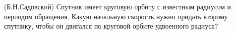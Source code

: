 (Б.Н.Садовский)
Спутник имеет круговую орбиту с известным радиусом и периодом обращения.
Какую начальную скорость нужно придать второму спутнику,
чтобы он двигался по круговой орбите удвоенного радиуса?

